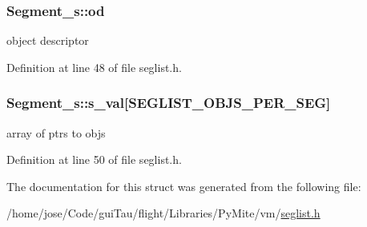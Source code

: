 \hypertarget{struct_segment__s_a283161062c488c7c23a0a0e64bd1a274}{
\subsubsection[{od}]{ Segment\-\_\-s\-::od}}\label{struct_segment__s_a283161062c488c7c23a0a0e64bd1a274}
object descriptor 

Definition at line 48 of file seglist.\-h.

\hypertarget{struct_segment__s_ac87339f4439d877230b2c149f1c48e69}{
\subsubsection[{s\-\_\-val}]{ Segment\-\_\-s\-::s\-\_\-val\mbox{[}S\-E\-G\-L\-I\-S\-T\-\_\-\-O\-B\-J\-S\-\_\-\-P\-E\-R\-\_\-\-S\-E\-G\mbox{]}}}\label{struct_segment__s_ac87339f4439d877230b2c149f1c48e69}
array of ptrs to objs 

Definition at line 50 of file seglist.\-h.



The documentation for this struct was generated from the following file\-:\begin{DoxyCompactItemize}
\item 
/home/jose/\-Code/gui\-Tau/flight/\-Libraries/\-Py\-Mite/vm/\hyperlink{seglist_8h}{seglist.\-h}\end{DoxyCompactItemize}
